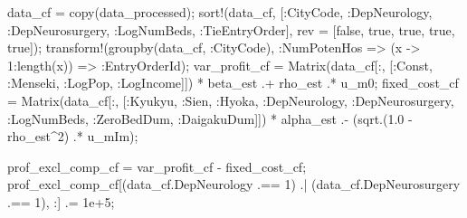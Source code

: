 \documentclass[
  letterpaper,
  DIV=11,
  numbers=noendperiod]{scrreprt}
\newenvironment{Shaded}{\begin{snugshade}}{\end{snugshade}}
\newcommand{\ConstantTok}[1]{\textcolor[rgb]{0.56,0.35,0.01}{#1}}
\newcommand{\FloatTok}[1]{\textcolor[rgb]{0.68,0.00,0.00}{#1}}
\newcommand{\FunctionTok}[1]{\textcolor[rgb]{0.28,0.35,0.67}{#1}}
\newcommand{\NormalTok}[1]{\textcolor[rgb]{0.00,0.23,0.31}{#1}}
\newcommand{\OperatorTok}[1]{\textcolor[rgb]{0.37,0.37,0.37}{#1}}
\begin{document}
\begin{Shaded}
\begin{Highlighting}[]
\NormalTok{data\_cf }\OperatorTok{=} \FunctionTok{copy}\NormalTok{(data\_processed);}
\FunctionTok{sort!}\NormalTok{(data\_cf, [}\OperatorTok{:}\NormalTok{CityCode, }\OperatorTok{:}\NormalTok{DepNeurology, }\OperatorTok{:}\NormalTok{DepNeurosurgery, }\OperatorTok{:}\NormalTok{LogNumBeds, }\OperatorTok{:}\NormalTok{TieEntryOrder], rev }\OperatorTok{=}\NormalTok{ [}\ConstantTok{false}\NormalTok{, }\ConstantTok{true}\NormalTok{, }\ConstantTok{true}\NormalTok{, }\ConstantTok{true}\NormalTok{, }\ConstantTok{true}\NormalTok{]);}
\FunctionTok{transform!}\NormalTok{(}\FunctionTok{groupby}\NormalTok{(data\_cf, }\OperatorTok{:}\NormalTok{CityCode), }\OperatorTok{:}\NormalTok{NumPotenHos }\OperatorTok{=\textgreater{}}\NormalTok{ (x }\OperatorTok{{-}\textgreater{}} \FloatTok{1}\OperatorTok{:}\FunctionTok{length}\NormalTok{(x)) }\OperatorTok{=\textgreater{}} \OperatorTok{:}\NormalTok{EntryOrderId);}
\NormalTok{var\_profit\_cf }\OperatorTok{=} \FunctionTok{Matrix}\NormalTok{(data\_cf[}\OperatorTok{:}\NormalTok{, [}\OperatorTok{:}\NormalTok{Const, }\OperatorTok{:}\NormalTok{Menseki, }\OperatorTok{:}\NormalTok{LogPop, }\OperatorTok{:}\NormalTok{LogIncome]]) }\OperatorTok{*}\NormalTok{ beta\_est }\OperatorTok{.+} 
\NormalTok{    rho\_est }\OperatorTok{.*}\NormalTok{ u\_m0;}
\NormalTok{fixed\_cost\_cf }\OperatorTok{=} \FunctionTok{Matrix}\NormalTok{(data\_cf[}\OperatorTok{:}\NormalTok{, [}\OperatorTok{:}\NormalTok{Kyukyu, }\OperatorTok{:}\NormalTok{Sien, }\OperatorTok{:}\NormalTok{Hyoka, }\OperatorTok{:}\NormalTok{DepNeurology, }\OperatorTok{:}\NormalTok{DepNeurosurgery, }\OperatorTok{:}\NormalTok{LogNumBeds, }\OperatorTok{:}\NormalTok{ZeroBedDum, }\OperatorTok{:}\NormalTok{DaigakuDum]]) }\OperatorTok{*}\NormalTok{ alpha\_est }\OperatorTok{.{-}}
\NormalTok{    (}\FunctionTok{sqrt}\NormalTok{.(}\FloatTok{1.0} \OperatorTok{{-}}\NormalTok{ rho\_est}\OperatorTok{\^{}}\FloatTok{2}\NormalTok{) }\OperatorTok{.*}\NormalTok{ u\_mIm);}

\NormalTok{prof\_excl\_comp\_cf }\OperatorTok{=}\NormalTok{ var\_profit\_cf }\OperatorTok{{-}}\NormalTok{ fixed\_cost\_cf;}
\NormalTok{prof\_excl\_comp\_cf[(data\_cf.DepNeurology }\OperatorTok{.==} \FloatTok{1}\NormalTok{) }\OperatorTok{.|}\NormalTok{ (data\_cf.DepNeurosurgery }\OperatorTok{.==} \FloatTok{1}\NormalTok{), }\OperatorTok{:}\NormalTok{] }\OperatorTok{.=} \FloatTok{1e+5}\NormalTok{;}
\end{Highlighting}
\end{Shaded}
\end{document}
